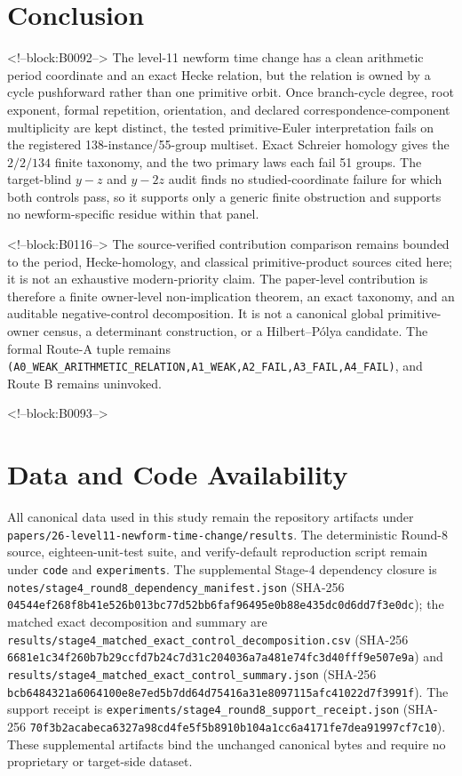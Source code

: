 \documentclass[11pt]{article}
\theoremstyle{definition}
\theoremstyle{remark}
\begin{document}
\section{Conclusion}

<!--block:B0092-->
The level-11 newform time change has a clean arithmetic period coordinate and an exact Hecke relation, but the relation is owned by a cycle pushforward rather than one primitive orbit. Once branch-cycle degree, root exponent, formal repetition, orientation, and declared correspondence-component multiplicity are kept distinct, the tested primitive-Euler interpretation fails on the registered 138-instance/55-group multiset. Exact Schreier homology gives the $2/2/134$ finite taxonomy, and the two primary laws each fail 51 groups. The target-blind $y-z$ and $y-2z$ audit finds no studied-coordinate failure for which both controls pass, so it supports only a generic finite obstruction and supports no newform-specific residue within that panel.

<!--block:B0116-->
The source-verified contribution comparison remains bounded to the period, Hecke-homology, and classical primitive-product sources cited here; it is not an exhaustive modern-priority claim. The paper-level contribution is therefore a finite owner-level non-implication theorem, an exact taxonomy, and an auditable negative-control decomposition. It is not a canonical global primitive-owner census, a determinant construction, or a Hilbert--Pólya candidate. The formal Route-A tuple remains \texttt{(A0\_WEAK\_ARITHMETIC\_RELATION,A1\_WEAK,A2\_FAIL,A3\_FAIL,A4\_FAIL)}, and Route B remains uninvoked.

<!--block:B0093-->
\section*{Data and Code Availability}
All canonical data used in this study remain the repository artifacts under \texttt{papers/26-level11-newform-time-change/results}. The deterministic Round-8 source, eighteen-unit-test suite, and verify-default reproduction script remain under \texttt{code} and \texttt{experiments}. The supplemental Stage-4 dependency closure is \texttt{notes/stage4\_round8\_dependency\_manifest.json} (SHA-256 \texttt{04544ef268f8b41e526b013bc77d52bb6faf96495e0b88e435dc0d6dd7f3e0dc}); the matched exact decomposition and summary are \texttt{results/stage4\_matched\_exact\_control\_decomposition.csv} (SHA-256 \texttt{6681e1c34f260b7b29ccfd7b24c7d31c204036a7a481e74fc3d40fff9e507e9a}) and \texttt{results/stage4\_matched\_exact\_control\_summary.json} (SHA-256 \texttt{bcb6484321a6064100e8e7ed5b7dd64d75416a31e8097115afc41022d7f3991f}). The support receipt is \texttt{experiments/stage4\_round8\_support\_receipt.json} (SHA-256 \texttt{70f3b2acabeca6327a98cd4fe5f5b8910b104a1cc6a4171fe7dea91997cf7c10}). These supplemental artifacts bind the unchanged canonical bytes and require no proprietary or target-side dataset.
\end{document}
